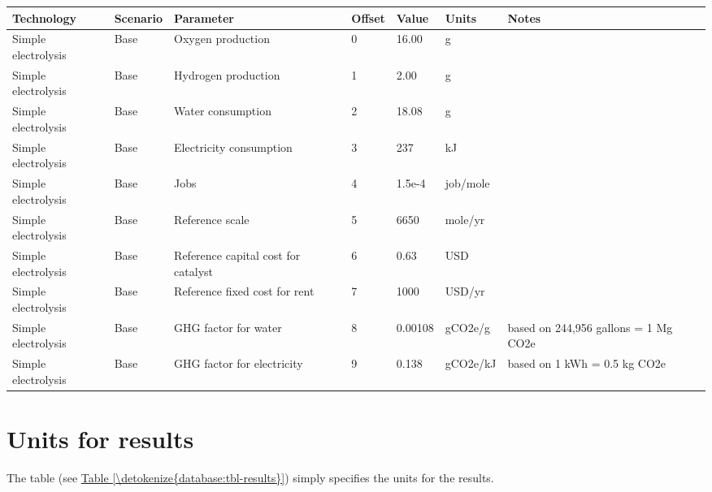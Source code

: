 \documentclass[letterpaper,10pt,english]{sphinxmanual}
\begin{document}
\begin{savenotes}\sphinxattablestart
\centering
{}
\sphinxthecaptionisattop
{}\label{\detokenize{database:table-4}}\label{\detokenize{database:tbl-parameters}}
\sphinxaftertopcaption
\begin{tabulary}{\linewidth}[t]{|T|T|T|T|T|T|T|}
\hline
\sphinxstyletheadfamily 
Technology
&\sphinxstyletheadfamily 
Scenario
&\sphinxstyletheadfamily 
Parameter
&\sphinxstyletheadfamily 
Offset
&\sphinxstyletheadfamily 
Value
&\sphinxstyletheadfamily 
Units
&\sphinxstyletheadfamily 
Notes
\\
\hline
Simple electrolysis
&
Base
&
Oxygen production
&
0
&
16.00
&
g
&\\
\hline
Simple electrolysis
&
Base
&
Hydrogen production
&
1
&
2.00
&
g
&\\
\hline
Simple electrolysis
&
Base
&
Water consumption
&
2
&
18.08
&
g
&\\
\hline
Simple electrolysis
&
Base
&
Electricity consumption
&
3
&
237
&
kJ
&\\
\hline
Simple electrolysis
&
Base
&
Jobs
&
4
&
1.5e-4
&
job/mole
&\\
\hline
Simple electrolysis
&
Base
&
Reference scale
&
5
&
6650
&
mole/yr
&\\
\hline
Simple electrolysis
&
Base
&
Reference capital cost for catalyst
&
6
&
0.63
&
USD
&\\
\hline
Simple electrolysis
&
Base
&
Reference fixed cost for rent
&
7
&
1000
&
USD/yr
&\\
\hline
Simple electrolysis
&
Base
&
GHG factor for water
&
8
&
0.00108
&
gCO2e/g
&
based on 244,956 gallons = 1 Mg CO2e
\\
\hline
Simple electrolysis
&
Base
&
GHG factor for electricity
&
9
&
0.138
&
gCO2e/kJ
&
based on 1 kWh = 0.5 kg CO2e
\\
\hline
\end{tabulary}
\par
\sphinxattableend\end{savenotes}


\section{Units for results}
\label{\detokenize{database:units-for-results}}
The  table (see \hyperref[\detokenize{database:tbl-results}]{Table \ref{\detokenize{database:tbl-results}}}) simply specifies the units for
the results.
\end{document}
